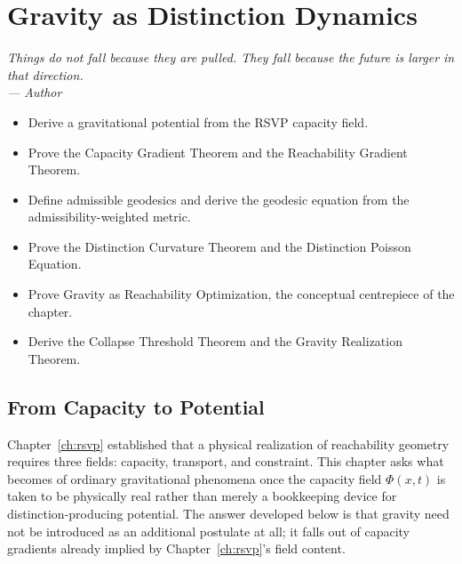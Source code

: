 \documentclass[12pt,twoside,openright]{book}
\newenvironment{epigraph}[2]{%
  \vspace{1em}\begin{flushright}
  \begin{minipage}{0.72\textwidth}
  \itshape\small #1\\[0.4em]
  \upshape\footnotesize\sffamily\color{DistGray}--- #2
  \end{minipage}\end{flushright}\vspace{1.5em}}{}
\newenvironment{objectives}{%
  \begin{tcolorbox}[colback=DistBlue!5,colframe=DistBlue,
    title={\faCheckCircle\enspace Learning Objectives},
    fonttitle=\sffamily\bfseries\color{white},
    attach boxed title to top left={yshift=-2mm,xshift=4mm},
    boxed title style={colback=DistBlue},breakable]
  \begin{itemize}[leftmargin=*,nosep]}{%
  \end{itemize}\end{tcolorbox}\vspace{1em}}
\begin{document}
\chapter{Gravity as Distinction Dynamics}
\label{ch:gravity}

\begin{epigraph}{%
  Things do not fall because they are pulled.
  They fall because the future is larger in that direction.}%
  {Author}
\end{epigraph}

\begin{objectives}
  \item Derive a gravitational potential from the RSVP
        capacity field.
  \item Prove the Capacity Gradient Theorem and the
        Reachability Gradient Theorem.
  \item Define admissible geodesics and derive the geodesic
        equation from the admissibility-weighted metric.
  \item Prove the Distinction Curvature Theorem and the
        Distinction Poisson Equation.
  \item Prove Gravity as Reachability Optimization, the
        conceptual centrepiece of the chapter.
  \item Derive the Collapse Threshold Theorem and the
        Gravity Realization Theorem.
\end{objectives}

\section{From Capacity to Potential}
\label{sec:ch17-potential}

Chapter~\ref{ch:rsvp} established that a physical realization
of reachability geometry requires three fields: capacity,
transport, and constraint. This chapter asks what becomes of
ordinary gravitational phenomena once the capacity field
$\Phi(x,t)$ is taken to be physically real rather than merely
a bookkeeping device for distinction-producing potential. The
answer developed below is that gravity need not be introduced
as an additional postulate at all; it falls out of capacity
gradients already implied by Chapter~\ref{ch:rsvp}'s field
content.
\end{document}
